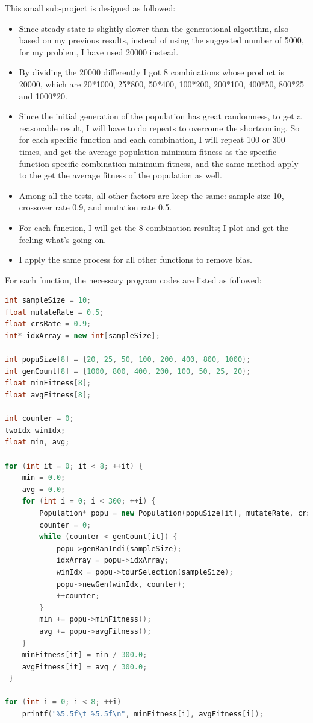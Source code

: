 \documentclass[10pt,b5paper]{article}
\begin{document}
This small sub-project is designed as followed:
\begin{itemize}
\item Since steady-state is slightly slower than the generational algorithm, also based on my previous results, instead of using the suggested number of 5000, for my problem, I have used 20000 instead.
\item By dividing the 20000 differently I got 8 combinations whose product is 20000, which are 20*1000, 25*800, 50*400, 100*200, 200*100, 400*50, 800*25 and 1000*20.
\item Since the initial generation of the population has great randomness, to get a reasonable result, I will have to do repeats to overcome the shortcoming. So for each specific function and each combination, I will repeat 100 or 300 times, and get the average population minimum fitness as the specific function specific combination minimum fitness, and the same method apply to the get the average fitness of the population as well.
\item Among all the tests, all other factors are keep the same: sample size 10, crossover rate 0.9, and mutation rate 0.5.
\item For each function, I will get the 8 combination results; I plot and get the feeling what's going on.
\item I apply the same process for all other functions to remove bias.
\end{itemize}

For each function, the necessary program codes are listed as followed:
\begin{lstlisting}[language=c++]
int sampleSize = 10;
float mutateRate = 0.5;
float crsRate = 0.9;
int* idxArray = new int[sampleSize];

int popuSize[8] = {20, 25, 50, 100, 200, 400, 800, 1000};
int genCount[8] = {1000, 800, 400, 200, 100, 50, 25, 20};
float minFitness[8];
float avgFitness[8];

int counter = 0;
twoIdx winIdx;
float min, avg;
     
for (int it = 0; it < 8; ++it) {     
    min = 0.0;
    avg = 0.0;
    for (int i = 0; i < 300; ++i) {         
        Population* popu = new Population(popuSize[it], mutateRate, crsRate, indi);
        counter = 0;
        while (counter < genCount[it]) {
            popu->genRanIndi(sampleSize);
            idxArray = popu->idxArray;
            winIdx = popu->tourSelection(sampleSize);
            popu->newGen(winIdx, counter);
            ++counter;
        }
        min += popu->minFitness();
        avg += popu->avgFitness();
    }
    minFitness[it] = min / 300.0;
    avgFitness[it] = avg / 300.0;
 }

for (int i = 0; i < 8; ++i) 
    printf("%5.5f\t %5.5f\n", minFitness[i], avgFitness[i]);
\end{lstlisting}
\end{document}
